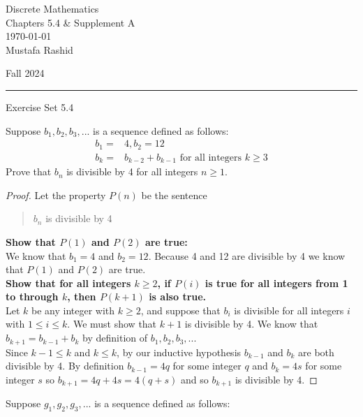 \documentclass[12pt,letterpaper, onecolumn]{exam}
\begin{document}
	
	\begingroup  
	\noindent\LARGE Discrete Mathematics\\
	\noindent\LARGE Chapters 5.4 \& Supplement A\\
	\noindent\large \today\\
	\noindent\large Mustafa Rashid\par
	\noindent\large Fall 2024\par
	\endgroup
	\rule{\textwidth}{0.4pt}
	\pointsdroppedatright
	\printanswers
	\renewcommand{\solutiontitle}{\noindent\textbf{Ans:}\enspace}  
	
	\centering\large Exercise Set 5.4\\
	\begin{questions}
			\setcounter{question}{1} \question  Suppose $b_1,b_2,b_3,...$ is a sequence defined as follows:
			\begin{align*} 
				b_1=&4, b_2=12\\
				b_k=&b_{k-2}+b_{k-1}\textrm{  for all integers } k\geq3
			\end{align*}
			Prove that $b_n$ is divisible by 4 for all integers $n\geq1.$
			\begin{solution}
				\begin{proof}
				Let the property $P(n)$ be the sentence
				\begin{quote}
						$b_n$ is divisible by 4
				\end{quote}
				\textbf{Show that $P(1)$ and $P(2)$ are true:}\\
				We know that $b_1=4$ and $b_2=12$. Because 4 and 12 are divisible by 4 we know that $P(1)$ and $P(2)$ are true.\\
				\textbf{Show that for all integers $k\geq2$, if $P(i)$ is true for all integers from 1 to through $k$, then $P(k+1)$ is also true.}\\
				Let $k$ be any integer with $k\geq2$, and suppose that $b_i$ is divisible for all integers $i$ with $1\leq i\leq k$. We must show that $k+1$ is divisible by 4. We know that $b_{k+1}=b_{k-1}+b_k$ by definition of  $b_1,b_2,b_3,...$\\
				Since $k-1\leq k$ and $k\leq k$, by our inductive hypothesis $b_{k-1}$ and $b_k$ are both divisible by 4. By definition  $b_{k-1}=4q$ for some integer $q$ and $b_k=4s$ for some integer $s$ so $b_{k+1}=4q+4s=4(q+s)$ and so $b_{k+1}$ is divisible by 4.
				\end{proof}
			\end{solution}
		\setcounter{question}{6} \question  Suppose $g_1,g_2,g_3,...$ is a sequence defined as follows:
		\begin{align*} 

\end{align*}
\end{questions}
\end{document}
